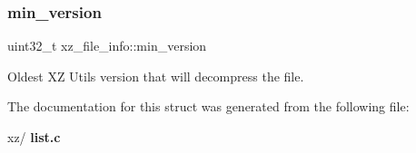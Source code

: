 \subsubsection{min\+\_\+version}
{\footnotesize\ttfamily uint32\+\_\+t xz\+\_\+file\+\_\+info\+::min\+\_\+version}



Oldest XZ Utils version that will decompress the file. 



The documentation for this struct was generated from the following file\+:\begin{DoxyCompactItemize}
\item 
xz/\textbf{ list.\+c}\end{DoxyCompactItemize}
